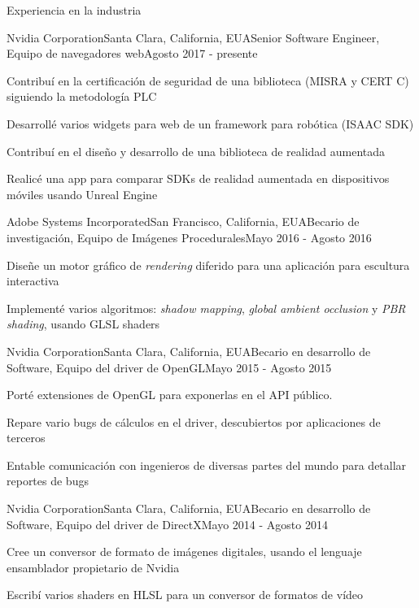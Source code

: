 \documentclass{resume} %
\begin{document}

\begin{rSection}{Experiencia en la industria}

\begin{rSubsection}{Nvidia Corporation}{Santa Clara, California, EUA}{Senior Software Engineer, Equipo de navegadores web}{Agosto 2017 - presente}
\item Contribuí en la certificación de seguridad de una biblioteca (MISRA y CERT C) siguiendo la metodología PLC
\item Desarrollé varios widgets para web de un framework para robótica (ISAAC SDK)
\item Contribuí en el diseño y desarrollo de una biblioteca de realidad aumentada
\item Realicé una app para comparar SDKs de realidad aumentada en dispositivos móviles usando Unreal Engine
\end{rSubsection}

\begin{rSubsection}{Adobe Systems Incorporated}{San Francisco, California, EUA}{Becario de investigación, Equipo de Imágenes Procedurales}{Mayo 2016 - Agosto 2016}
\item Diseñe un motor gráfico de \emph{rendering} diferido para una aplicación para escultura interactiva
\item Implementé varios algoritmos: \emph{shadow mapping}, \emph{global ambient occlusion} y \emph{PBR shading}, usando GLSL shaders
\end{rSubsection}

\begin{rSubsection}{Nvidia Corporation}{Santa Clara, California, EUA}{Becario en desarrollo de Software, Equipo del driver de OpenGL}{Mayo 2015 - Agosto 2015}
\item Porté extensiones de OpenGL para exponerlas en el API público.
\item Repare vario bugs de cálculos en el driver, descubiertos por aplicaciones de terceros
\item Entable comunicación con ingenieros de diversas partes del mundo para detallar reportes de bugs
\end{rSubsection}

\begin{rSubsection}{Nvidia Corporation}{Santa Clara, California, EUA}{Becario en desarrollo de Software, Equipo del driver de DirectX}{Mayo 2014 - Agosto 2014}
\item Cree un conversor de formato de imágenes digitales, usando el lenguaje ensamblador propietario de Nvidia
\item Escribí varios shaders en HLSL para un conversor de formatos de vídeo
\end{rSubsection}


\end{rSection}
\end{document}
